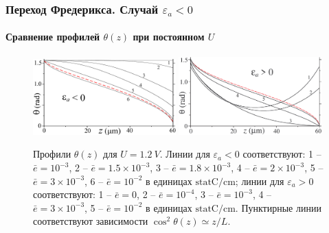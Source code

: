 \documentclass[utf8,secheader]{beamer}
\begin{document}
\begin{frame}
\frametitle{Переход Фредерикса. Случай $\varepsilon_a < 0$}
\framesubtitle{Сравнение профилей $\theta(z)$ при постоянном $U$}
\begin{figure}[h]
\includegraphics[width=0.49\textwidth]{Fig4_parody1a.eps}%
\includegraphics[width=0.49\textwidth]{symm_all_6curvesNoReflect1b.eps}
\caption{ Профили $\theta(z)$ для $U=1.2 ~V$. Линии для $\varepsilon_a<0$ соответствуют: 1 -- $\bar{e}=10^{-3}$, 2 -- $\bar{e}=1.5\times 10^{-3}$, 3 -- $\bar{e}=1.8\times 10^{-3}$, 4 -- $\bar{e}=2\times 10^{-3}$, 5 -- $\bar{e}=3\times 10^{-3}$, 6 -- $\bar{e}=10^{-2}$  в единицах $ \mathrm{statC/cm}$; линии для  $\varepsilon_a > 0$ соответствуют: 1 -- $\bar{e}=0$, 2 -- $\bar{e}=10^{-4}$, 3 -- $\bar{e}=10^{-3}$, 4 -- $\bar{e}=3\times 10^{-3}$, 5 -- $\bar{e}=10^{-2}$ в единицах $\mathrm{statC/cm}$. Пунктирные линии соответствуют зависимости $\cos^2\theta(z)\simeq {z/L}$.}
\end{figure}
\end{frame}
\end{document}
